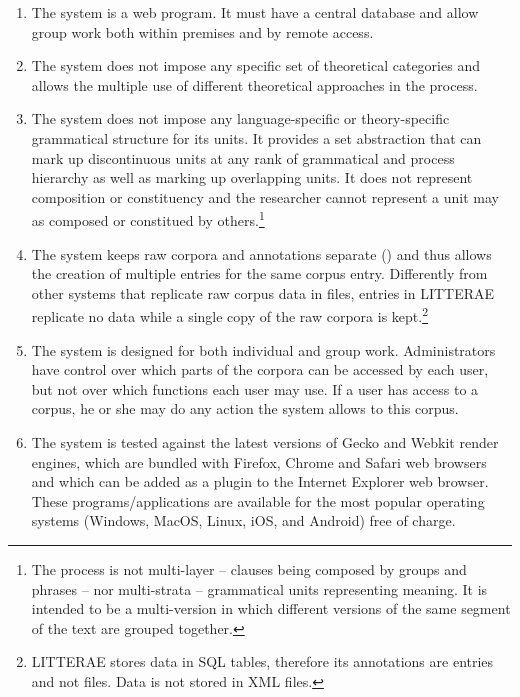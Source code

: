 \documentclass[output=paper]{LSP/langsci}
\begin{document}
\largerpage
\begin{enumerate}
\item  The system is a web program. It must have a central database and allow group work both within premises and by remote access.
\item  The system does not impose any specific set of theoretical categories and allows the multiple use of different theoretical approaches in the  process.
\item  The system does not impose any language-specific or theory-specific grammatical structure for its  units. It provides a set abstraction that can mark up discontinuous units at any rank of grammatical and process hierarchy as well as marking up overlapping units. It does not represent composition or constituency and the researcher cannot represent a unit may as composed or constitued by others.\footnote{The process  is not multi-layer -- clauses being composed by groups and phrases -- nor multi-strata -- grammatical units representing meaning. It is intended to be a multi-version  in which different versions of the same segment of the text are grouped together.}
\item  The system keeps raw corpora and annotations separate () and thus allows the creation of multiple  entries for the same corpus entry. Differently from other systems that replicate raw corpus data in  files,  entries in LITTERAE replicate no data while a single copy of the raw corpora is kept.\footnote{LITTERAE stores data in SQL tables, therefore its annotations are entries and not files. Data is not stored in XML files.}
\item  The system is designed for both individual and group work. Administrators have control over which parts of the corpora can be accessed by each user, but not over which functions each user may use. If a user has access to a corpus, he or she may do any action the system allows to this corpus.
\item  The system is tested against the latest versions of Gecko and Webkit render engines, which are bundled with Firefox, Chrome and Safari web browsers and which can be added as a plugin to the Internet Explorer web browser. These programs/applications are available for the most popular operating systems (Windows, MacOS, Linux, iOS, and Android) free of charge.\\
\end{enumerate}
\end{document}
